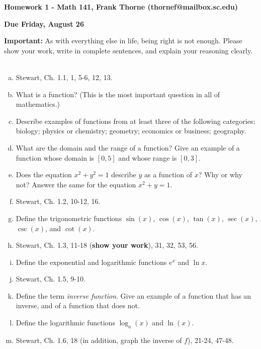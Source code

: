 \documentclass[12pt]{article}
\begin{document}
\setlength{\topmargin}{-2mm}





\author{Math 42 Pretest - Frank Thorne}
\begin{center}{\bf Homework 1 - Math 141, Frank Thorne (thornef@mailbox.sc.edu)}
\end{center}
\begin{center}
{\bf Due Friday, August 26}
\end{center}

{\bf Important:} As with everything else in life, being right is not enough.
Please show your work, write in complete sentences, and explain your reasoning clearly. 
\\
\\
\begin{enumerate}[(a)]
\item 
Stewart, Ch. 1.1, 1, 5-6, 12, 13.

\item
What is a function? (This is the most important question in all of mathematics.)

\item
Describe examples of functions from at least three of the following categories:
biology; physics or chemistry; geometry; economics or business; geography.

\item
What are the domain and the range of a function? Give an example of a function whose
domain is $[0, 5]$ and whose range is $[0, 3]$.

\item
Does the equation $x^2 + y^2 = 1$ describe $y$ as a function of $x$? Why or why not?
Answer the same for the equation $x^2 + y = 1$.

\item
Stewart, Ch. 1.2, 10-12, 16.

\item
Define the trigonometric 
functions $\sin(x)$, $\cos(x)$, $\tan(x)$, $\sec(x)$, $\csc(x)$,
and $\cot(x)$.

\item
Stewart, Ch. 1.3, 11-18 ({\bf show your work}), 31, 32, 53, 56.

\item
Define the exponential and logarithmic functions $e^x$ and $\ln x$. 

\item
Stewart, Ch. 1.5, 9-10.

\item
Define the term {\itshape inverse function}. Give an example of a function that has an inverse,
and of a function that does not.

\item
Define the logarithmic functions $\log_a(x)$ and $\ln(x)$.

\item
Stewart, Ch. 1.6, 18 (in addition, graph the inverse of $f$), 21-24, 47-48.

\end{enumerate}
\end{document}
